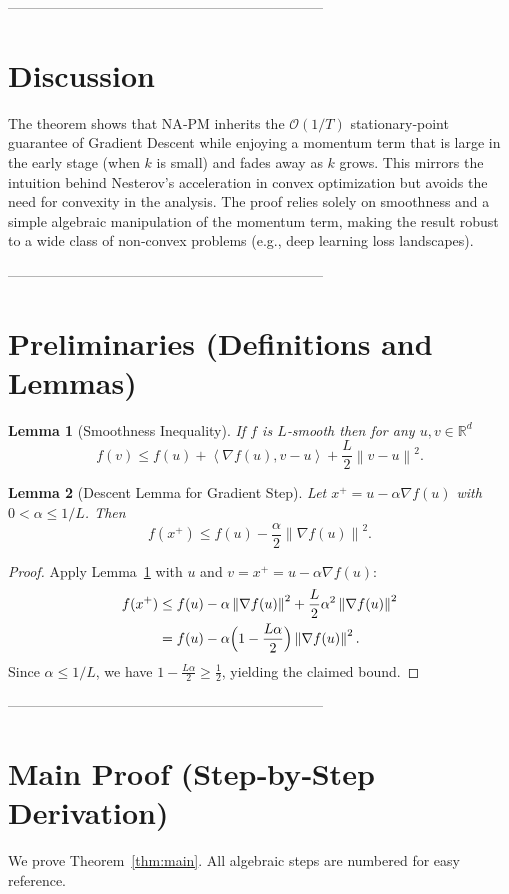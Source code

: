 \documentclass{article}
\newtheorem{lemma}{Lemma}
\newcommand{\R}{\mathbb{R}}
\newcommand{\norm}[1]{\left\lVert#1\right\rVert}
\newcommand{\inner}[2]{\left\langle #1,#2\right\rangle}
\begin{document}
--------------------------------------------------------------------

\section*{Discussion}
The theorem shows that NA‑PM inherits the $\mathcal O(1/T)$ stationary‑point guarantee of Gradient Descent while enjoying a momentum term that is large in the early stage (when $k$ is small) and fades away as $k$ grows. This mirrors the intuition behind Nesterov’s acceleration in convex optimization but avoids the need for convexity in the analysis. The proof relies solely on smoothness and a simple algebraic manipulation of the momentum term, making the result robust to a wide class of non‑convex problems (e.g., deep learning loss landscapes).

--------------------------------------------------------------------

\section*{Preliminaries (Definitions and Lemmas)}
\begin{lemma}[Smoothness Inequality]\label{lem:smooth}
If $f$ is $L$‑smooth then for any $u,v\in\R^d$
\[
f(v)\le f(u)+\inner{\nabla f(u)}{v-u}+\frac{L}{2}\norm{v-u}^2 .
\]
\end{lemma}
\begin{lemma}[Descent Lemma for Gradient Step]\label{lem:descent}
Let $x^+=u-\alpha\nabla f(u)$ with $0<\alpha\le 1/L$. Then
\[
f(x^+)\le f(u)-\frac{\alpha}{2}\norm{\nabla f(u)}^2 .
\]
\end{lemma}
\begin{proof}
Apply Lemma~\ref{lem:smooth} with $u$ and $v=x^+=u-\alpha\nabla f(u)$:
\[
\begin{aligned}
f(x^+)&\le f(u)-\alpha\norm{\nabla f(u)}^2
      +\frac{L}{2}\alpha^2\norm{\nabla f(u)}^2\\
      &=f(u)-\alpha\Bigl(1-\frac{L\alpha}{2}\Bigr)\norm{\nabla f(u)}^2 .
\end{aligned}
\]
Since $\alpha\le 1/L$, we have $1-\frac{L\alpha}{2}\ge \frac12$, yielding the claimed bound. \hfill\qedsymbol
\end{proof}

--------------------------------------------------------------------

\section*{Main Proof (Step‑by‑Step Derivation)}
We prove Theorem~\ref{thm:main}.  All algebraic steps are numbered for easy reference.
\end{document}
